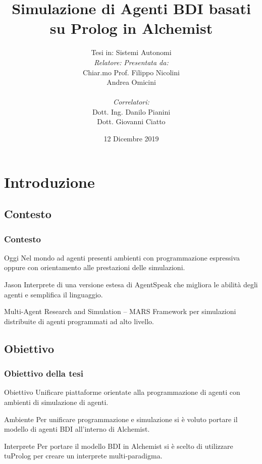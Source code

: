 \documentclass[handout]{beamer}\mode<presentation>{\usetheme{AMSCesenaBleu}}
\title[Prolog BDI agents on Alchemist]{Simulazione di Agenti BDI basati su Prolog in Alchemist}
\author[Filippo Nicolini]{Tesi in: Sistemi Autonomi\\
[0.5cm]
\textit{Relatore:} \hspace{6.55cm} \textit{Presentata da:}\\
Chiar.mo Prof. \hspace{5.5cm} Filippo Nicolini\\
Andrea Omicini \hspace{7.6cm} \phantom{g}\\
\textit{\\Correlatori:} \hspace{8.25cm} \phantom{g}\\
Dott. Ing. Danilo Pianini \hspace{6cm} \phantom{g}\\
Dott. Giovanni Ciatto \hspace{6.5cm} \phantom{g}\\
}
\institute[]{
\textsc{Alma Mater Studiorum} -- Università di Bologna \\
Campus di Cesena}
\date{12 Dicembre 2019}
\begin{document}
\maketitle


\section{Introduzione}

\subsection{Contesto}
\begin{frame}
\frametitle{Contesto}
\begin{block}{Oggi}
Nel mondo ad agenti presenti ambienti con programmazione espressiva oppure con orientamento alle prestazioni delle simulazioni.
\end{block}

\begin{block}{Jason}
Interprete di una versione estesa di AgentSpeak che migliora le abilità degli agenti e semplifica il linguaggio.
\end{block}

\begin{block}{Multi-Agent Research and Simulation -- MARS}
Framework per simulazioni distribuite di agenti programmati ad alto livello.
\end{block}
\end{frame}

\subsection{Obiettivo}
\begin{frame}
\frametitle{Obiettivo della tesi}
\begin{block}{Obiettivo}
\alert{Unificare} piattaforme orientate alla \alert{programmazione di agenti} con ambienti di \alert{simulazione di agenti}.
\end{block}

\begin{block}{Ambiente}
Per unificare programmazione e simulazione si è voluto portare il modello di agenti BDI all'interno di Alchemist.
\end{block}

\begin{block}{Interprete}
Per portare il modello BDI in Alchemist si è scelto di utilizzare tuProlog per creare un interprete multi-paradigma.
\end{block}
\end{frame}
\end{document}
